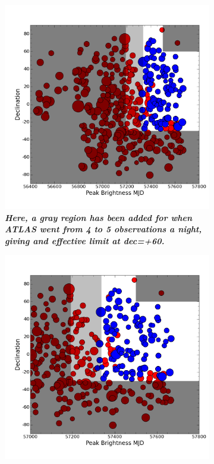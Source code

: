 \begin{figure}
	\centering
	\begin{subfigure}{.5\textwidth}
	  \centering
			\includegraphics[width=1\linewidth]{figures/variations/plot2useinPaper.png}
		\caption{\it \small{{\bf Here, a gray region has been added for when ATLAS went from 4 to 5 observations a night, giving and effective limit at dec=+60\deg.}}}
		\label{fig:var5}
	\end{subfigure}%
	\begin{subfigure}{.5\textwidth}
	  \centering
			\includegraphics[width=1\linewidth]{figures/plot2useinPaper_restrictx.png}

\end{subfigure}
\end{figure}
